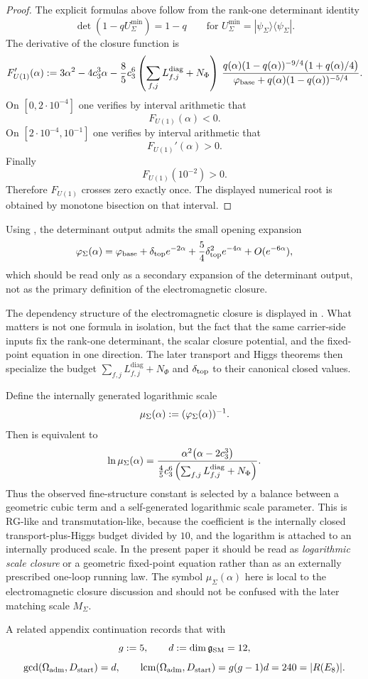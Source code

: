 \begin{proof}
The explicit formulas above follow from the rank-one determinant identity
\[
\det(1-qU_{\Sigma}^{\min})=1-q
\qquad
\text{for } U_{\Sigma}^{\min}=|\psi_{\Sigma}\rangle\langle\psi_{\Sigma}|.
\]
The derivative of the closure function is
\[
F_{U(1)}'(\alpha)
:=
3\alpha^2-4c_3^3\alpha
-\frac85c_3^6\left(\sum_{f,j}L_{f,j}^{\mathrm{diag}}+N_\Phi\right)\,
\frac{q(\alpha)(1-q(\alpha))^{-9/4}\bigl(1+q(\alpha)/4\bigr)}
{\varphi_{\mathrm{base}}+q(\alpha)(1-q(\alpha))^{-5/4}}.
\]
On $[0,2\cdot 10^{-4}]$ one verifies by interval arithmetic that
\[
F_{U(1)}(\alpha)<0.
\]
On $[2\cdot 10^{-4},10^{-1}]$ one verifies by interval arithmetic that
\[
F_{U(1)}'(\alpha)>0.
\]
Finally
\[
F_{U(1)}(10^{-2})>0.
\]
Therefore $F_{U(1)}$ crosses zero exactly once. The displayed numerical root is obtained by
monotone bisection on that interval.
\end{proof}

\begin{remark}
Using , the determinant output admits the small
opening expansion
\[
\varphi_{\Sigma}(\alpha)
=
\varphi_{\mathrm{base}}
+\delta_{\mathrm{top}} e^{-2\alpha}
+\frac54\delta_{\mathrm{top}}^2e^{-4\alpha}
+O(e^{-6\alpha}),
\]
which should be read only as a secondary expansion of the determinant output, not as the primary
definition of the electromagnetic closure.
\end{remark}

The dependency structure of the electromagnetic closure is displayed in
. What matters is not one formula in isolation, but the fact that
the same carrier-side inputs fix the rank-one determinant, the scalar closure potential, and the
fixed-point equation in one direction. The later transport and Higgs theorems then specialize the
budget $\sum_{f,j}L_{f,j}^{\mathrm{diag}}+N_\Phi$ and $\delta_{\mathrm{top}}$ to their canonical closed values.
\begin{remark}
Define the internally generated logarithmic scale
\[
\mu_\Sigma(\alpha):=(\varphi_{\Sigma}(\alpha))^{-1}.
\]
Then  is equivalent to
\[
\ln \mu_\Sigma(\alpha)
=
\frac{\alpha^2\bigl(\alpha-2c_3^3\bigr)}
{\frac45c_3^6\left(\sum_{f,j}L_{f,j}^{\mathrm{diag}}+N_\Phi\right)}.
\]
Thus the observed fine-structure constant is selected by a balance between a geometric cubic term
and a self-generated logarithmic scale parameter. This is RG-like and transmutation-like,
because the coefficient is the internally closed transport-plus-Higgs budget divided by $10$, and
the logarithm is attached to an internally produced scale. In the present paper it should be read
as \emph{logarithmic scale closure} or a geometric fixed-point equation rather than as an externally
prescribed one-loop running law. The symbol $\mu_\Sigma(\alpha)$ here is local to the
electromagnetic closure discussion and should not be confused with the later matching scale
$M_\Sigma$.
\end{remark}
A related appendix continuation records that with
\[
g:=5,
\qquad
d:=\dim \mathfrak g_{\mathrm{SM}}=12,
\]
\[
\gcd(\Omega_{\mathrm{adm}},D_{\mathrm{start}})=d,
\qquad
\operatorname{lcm}(\Omega_{\mathrm{adm}},D_{\mathrm{start}})=g(g-1)d=240=|R(E_8)|.
\]

